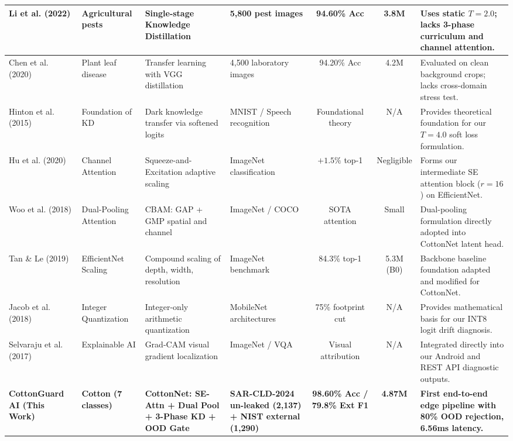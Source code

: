 \documentclass[journal,10pt,twocolumn]{IEEEtran}
\begin{document}
\begin{table}[t]
{\begin{tabular}{lp{2.4cm}p{3.2cm}p{3.0cm}ccp{3.8cm}}
Li et al. (2022) \cite{li2022lightweight} & Agricultural pests & Single-stage Knowledge Distillation & 5,800 pest images & 94.60\% Acc & 3.8M & Uses static $T=2.0$; lacks 3-phase curriculum and channel attention. \\
\midrule
Chen et al. (2020) \cite{chen2020using} & Plant leaf disease & Transfer learning with VGG distillation & 4,500 laboratory images & 94.20\% Acc & 4.2M & Evaluated on clean background crops; lacks cross-domain stress test. \\
\midrule
Hinton et al. (2015) \cite{hinton2015distilling} & Foundation of KD & Dark knowledge transfer via softened logits & MNIST / Speech recognition & Foundational theory & N/A & Provides theoretical foundation for our $T=4.0$ soft loss formulation. \\
\midrule
Hu et al. (2020) \cite{hu2020squeeze} & Channel Attention & Squeeze-and-Excitation adaptive scaling & ImageNet classification & $+1.5\%$ top-1 & Negligible & Forms our intermediate SE attention block ($r=16$) on EfficientNet. \\
\midrule
Woo et al. (2018) \cite{woo2018cbam} & Dual-Pooling Attention & CBAM: GAP + GMP spatial and channel & ImageNet / COCO & SOTA attention & Small & Dual-pooling formulation directly adopted into CottonNet latent head. \\
\midrule
Tan \& Le (2019) \cite{tan2019efficientnet} & EfficientNet Scaling & Compound scaling of depth, width, resolution & ImageNet benchmark & 84.3\% top-1 & 5.3M (B0) & Backbone baseline foundation adapted and modified for CottonNet. \\
\midrule
Jacob et al. (2018) \cite{jacob2018quantization} & Integer Quantization & Integer-only arithmetic quantization & MobileNet architectures & 75\% footprint cut & N/A & Provides mathematical basis for our INT8 logit drift diagnosis. \\
\midrule
Selvaraju et al. (2017) \cite{selvaraju2017grad} & Explainable AI & Grad-CAM visual gradient localization & ImageNet / VQA & Visual attribution & N/A & Integrated directly into our Android and REST API diagnostic outputs. \\
\midrule
\textbf{CottonGuard AI (This Work)} & \textbf{Cotton (7 classes)} & \textbf{CottonNet: SE-Attn + Dual Pool + 3-Phase KD + OOD Gate} & \textbf{SAR-CLD-2024 un-leaked (2,137) + NIST external (1,290)} & \textbf{98.60\% Acc / 79.8\% Ext F1} & \textbf{4.87M} & \textbf{First end-to-end edge pipeline with 80\% OOD rejection, 6.56ms latency.} \\
\bottomrule
\end{tabular}%
}
\end{table}
\end{document}
